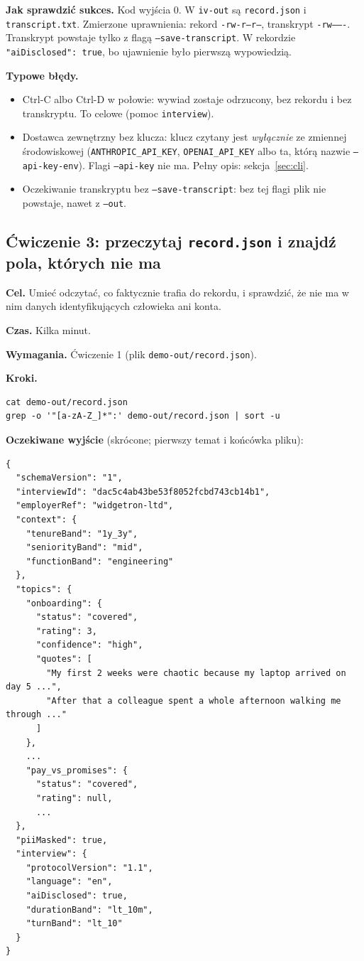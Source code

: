 {\textbf{Jak sprawdzić sukces.} Kod wyjścia 0. W \texttt{iv-out} są
\texttt{record.json} i \texttt{transcript.txt}. Zmierzone uprawnienia: rekord
\texttt{-rw-r--r--}, transkrypt \texttt{-rw-------}. Transkrypt powstaje tylko
z flagą \texttt{--save-transcript}. W rekordzie \texttt{"aiDisclosed": true}, bo
ujawnienie było pierwszą wypowiedzią.

\textbf{Typowe błędy.}
\begin{itemize}[leftmargin=*,itemsep=1pt]
  \item Ctrl-C albo Ctrl-D w połowie: wywiad zostaje odrzucony, bez rekordu i bez
        transkryptu. To celowe (pomoc \texttt{interview}).
  \item Dostawca zewnętrzny bez klucza: klucz czytany jest \emph{wyłącznie} ze
        zmiennej środowiskowej (\texttt{ANTHROPIC\_API\_KEY}, \texttt{OPENAI\_API\_KEY}
        albo ta, którą nazwie \texttt{--api-key-env}). Flagi \texttt{--api-key} nie ma.
        Pełny opis: sekcja~\ref{sec:cli}.
  \item Oczekiwanie transkryptu bez \texttt{--save-transcript}: bez tej flagi
        plik nie powstaje, nawet z \texttt{--out}.
\end{itemize}

\subsection{Ćwiczenie 3: przeczytaj \texttt{record.json} i znajdź pola, których nie ma}

\textbf{Cel.} Umieć odczytać, co faktycznie trafia do rekordu, i sprawdzić, że
nie ma w nim danych identyfikujących człowieka ani konta.

\textbf{Czas.} Kilka minut.

\textbf{Wymagania.} Ćwiczenie 1 (plik \texttt{demo-out/record.json}).

\textbf{Kroki.}

\begin{Verbatim}[fontsize=\scriptsize,frame=single,framesep=2mm]
cat demo-out/record.json
grep -o '"[a-zA-Z_]*":' demo-out/record.json | sort -u
\end{Verbatim}

\textbf{Oczekiwane wyjście} (skrócone; pierwszy temat i końcówka pliku):

\begin{Verbatim}[fontsize=\scriptsize,frame=single,framesep=2mm]
{
  "schemaVersion": "1",
  "interviewId": "dac5c4ab43be53f8052fcbd743cb14b1",
  "employerRef": "widgetron-ltd",
  "context": {
    "tenureBand": "1y_3y",
    "seniorityBand": "mid",
    "functionBand": "engineering"
  },
  "topics": {
    "onboarding": {
      "status": "covered",
      "rating": 3,
      "confidence": "high",
      "quotes": [
        "My first 2 weeks were chaotic because my laptop arrived on day 5 ...",
        "After that a colleague spent a whole afternoon walking me through ..."
      ]
    },
    ...
    "pay_vs_promises": {
      "status": "covered",
      "rating": null,
      ...
  },
  "piiMasked": true,
  "interview": {
    "protocolVersion": "1.1",
    "language": "en",
    "aiDisclosed": true,
    "durationBand": "lt_10m",
    "turnBand": "lt_10"
  }
}
\end{Verbatim}

}
